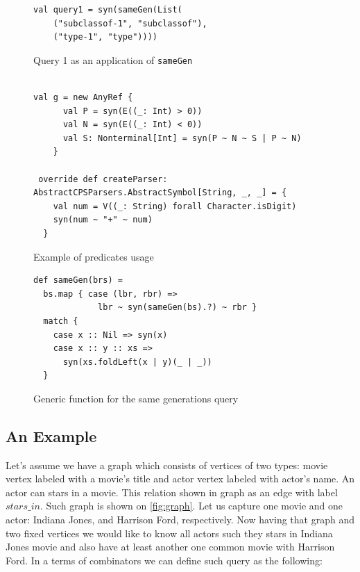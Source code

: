 \begin{figure}[h]
\begin{lstlisting}
val query1 = syn(sameGen(List(
    ("subclassof-1", "subclassof"),
    ("type-1", "type"))))
\end{lstlisting}
\caption{Query 1 as an application of \lstinline{sameGen}}
\label{fig:query1Gen}
\end{figure}

\begin{figure}[h]
\begin{lstlisting}

val g = new AnyRef {
      val P = syn(E((_: Int) > 0))
      val N = syn(E((_: Int) < 0))
      val S: Nonterminal[Int] = syn(P ~ N ~ S | P ~ N)
    }

 override def createParser: AbstractCPSParsers.AbstractSymbol[String, _, _] = {
    val num = V((_: String) forall Character.isDigit)
    syn(num ~ "+" ~ num)
  }

\end{lstlisting}
\caption{Example of predicates usage}
\label{fig:gen}
\end{figure}


\begin{figure}[h]
\begin{lstlisting}
def sameGen(brs) =
  bs.map { case (lbr, rbr) => 
             lbr ~ syn(sameGen(bs).?) ~ rbr } 
  match {
    case x :: Nil => syn(x)
    case x :: y :: xs => 
      syn(xs.foldLeft(x | y)(_ | _))
  }
\end{lstlisting}
\caption{Generic function for the same generations query}
\label{fig:gen}
\end{figure}

\subsection{An Example}
Let's assume we have a graph which consists of vertices of two types: movie vertex labeled with a movie's title and actor vertex labeled with actor's name. An actor can stars in a movie. This relation shown in graph as an edge with label $stars\_in$. Such graph is shown on \ref{fig:graph}. Let us capture one movie and one actor: Indiana Jones, and Harrison Ford, respectively. Now having that graph and two fixed vertices we would like to know all actors such they stars in Indiana Jones movie and also have at least another one common movie with Harrison Ford. In a terms of combinators we can define such query as the following: 

